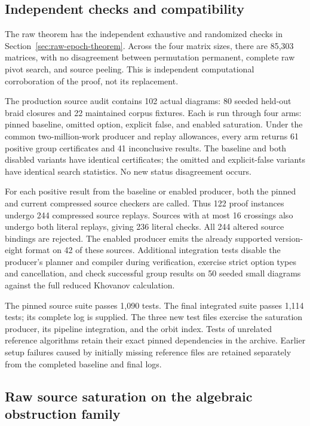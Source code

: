 \subsection{Independent checks and compatibility}

The raw theorem has the independent exhaustive and randomized checks in
Section~\ref{sec:raw-epoch-theorem}. Across the four matrix sizes, there
are 85,303 matrices, with no disagreement between permutation permanent,
complete raw pivot search, and source peeling. This is independent
computational corroboration of the proof, not its replacement.

The production source audit contains 102 actual diagrams: 80 seeded
held-out braid closures and 22 maintained corpus fixtures. Each is run
through four arms: pinned baseline, omitted option, explicit false, and
enabled saturation. Under the common two-million-work producer and replay
allowances, every
arm returns 61 positive group certificates and 41 inconclusive results.
The baseline and both disabled variants have identical certificates;
the omitted and explicit-false variants have identical search statistics.
No new status disagreement occurs.

For each positive result from the baseline or enabled producer, both the
pinned and current compressed source checkers are called. Thus 122 proof
instances undergo 244 compressed source replays. Sources with at most
16 crossings also undergo both literal replays, giving 236 literal checks.
All 244 altered source bindings are rejected. The enabled producer emits
the already supported version-eight format on 42 of these sources.
Additional integration tests disable the producer's planner and compiler
during verification, exercise strict option types and cancellation, and
check successful group results on 50 seeded small diagrams against the
full reduced Khovanov calculation.

The pinned source suite passes 1,090 tests. The final integrated suite
passes 1,114 tests; its complete log is supplied. The
three new test files exercise the saturation producer, its pipeline
integration, and the orbit index. Tests of unrelated reference algorithms
retain their exact pinned dependencies in the archive. Earlier setup
failures caused by initially missing reference files are retained
separately from the completed baseline and final logs.

\subsection{Raw source saturation on the algebraic obstruction family}

